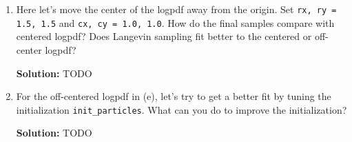 \documentclass{article}
\newenvironment{solution}{\color{blue} \smallskip \textbf{Solution:}}{}
\begin{document}
\begin{enumerate}
    \begin{solution}
        TODO
    \end{solution}

    \item 
    Here let's move the center of the logpdf away from the origin. 
    Set \texttt{rx, ry = 1.5, 1.5} and \texttt{cx, cy = 1.0, 1.0}. 
    How do the final samples compare with centered logpdf? 
    Does Langevin sampling fit better to the centered or off-center logpdf?

    \begin{solution}
        TODO
    \end{solution}

    \item 
    For the off-centered logpdf in (e), let's try to get a better fit by tuning the initialization
    \texttt{init\_particles}. What can you do to improve the initialization?

    \begin{solution}
        TODO
    \end{solution}
\end{enumerate}
\end{document}
